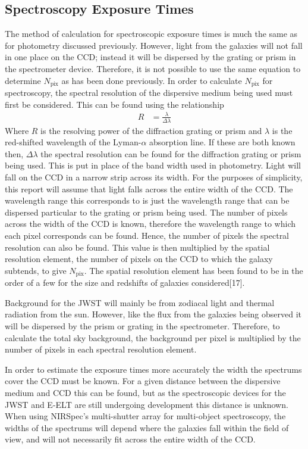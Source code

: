 \subsection{Spectroscopy Exposure Times} %
\label{sub:calculation_of_exposure_times}
	The method of calculation for spectroscopic exposure times is much the same as for photometry discussed previously. However, light from the galaxies will not fall in one place on the CCD; instead it will be dispersed by the grating or prism in the spectrometer device. Therefore, it is not possible to use the same equation to determine $N_\text{pix}$ as has been done previously. In order to calculate $N_\text{pix}$ for spectroscopy, the spectral resolution of the dispersive medium being used must first be considered. This can be found using the relationship
	\begin{align}
		R &= \frac{\lambda}{\Delta\lambda}
	\end{align}
	Where $R$ is the resolving power of the diffraction grating or prism and $\lambda$ is the red-shifted wavelength of the Lyman-$\alpha$ absorption line. If these are both known then, $\Delta\lambda$ the spectral resolution can be found for the diffraction grating or prism being used. This is put in place of the band width used in photometry. Light will fall on the CCD in a narrow strip across its width. For the purposes of simplicity, this report will assume that light falls across the entire width of the CCD. The wavelength range this corresponds to is just the wavelength range that can be dispersed particular to the grating or prism being used. The number of pixels across the width of the CCD is known, therefore the wavelength range to which each pixel corresponds can be found. Hence, the number of pixels the spectral resolution can also be found. This value is then multiplied by the spatial resolution element, the number of pixels on the CCD to which the galaxy subtends, to give $N_\text{pix}$. The spatial resolution element has been found to be in the order of a few for the size and redshifts of galaxies considered\cite{}[17].

	Background for the JWST will mainly be from zodiacal light and thermal radiation from the sun. However, like the flux from the galaxies being observed it will be dispersed by the prism or grating in the spectrometer. Therefore, to calculate the total sky background, the background per pixel is multiplied by the number of pixels in each spectral resolution element.

	In order to estimate the exposure times more accurately the width the spectrums cover the CCD must be known. For a given distance between the dispersive medium and CCD this can be found, but as the spectroscopic devices for the JWST and E-ELT are still undergoing development this distance is unknown. When using NIRSpec's multi-shutter array for multi-object spectroscopy, the widths of the spectrums will depend where the galaxies fall within the field of view, and will not necessarily fit across the entire width of the CCD.

